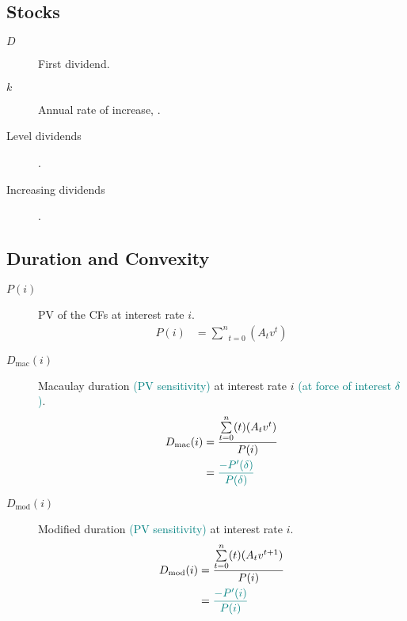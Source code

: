 \documentclass[10pt, french]{article}
\begin{document}
\begin{multicols*}{2}
\subsection{Stocks}
\begin{definitionNOHFILLprop}
\begin{distributions}[Notation]
\begin{description}
	\item[$D$]	First dividend.
	\item[$k$]	Annual rate of increase, .
\end{description}
\end{distributions}
\begin{description}
	\item[Level dividends]	.
	\item[Increasing dividends]	.
\end{description}
\end{definitionNOHFILLprop}


\subsection{Duration and Convexity}
\begin{description}
	\item[$P(i)$]	PV of the CFs at interest rate $i$.
		\begin{align*}
		P(i)	
		&=	\underset{t = 0}{\overset{n}{\sum}} (A_{t}v^{t})
		\end{align*}
\end{description}

\begin{definitionNOHFILLsub}[Duration]
\begin{description}
	\item[$D_{\text{mac}}(i)$]	Macaulay duration \textcolor{teal}{(PV sensitivity)} at interest rate $i$ \textcolor{teal}{(at force of interest $\delta$)}.
		\begin{align*}
		D_{\text{mac}}(i)
		&=	\frac{\underset{t = 0}{\overset{n}{\sum}} (t) (A_{t}v^{t})}{P(i)}	\\
		&=	\textcolor{teal}{\frac{-P'(\delta)}{P(\delta)}}
		\end{align*}
	\item[$D_{\text{mod}}(i)$]	Modified duration \textcolor{teal}{(PV sensitivity)} at interest rate $i$.
		\begin{align*}
		D_{\text{mod}}(i)
		&=	\frac{\underset{t = 0}{\overset{n}{\sum}} (t) (A_{t}v^{t + 1})}{P(i)}	\\
		&=	\textcolor{teal}{\frac{-P'(i)}{P(i)}}
		\end{align*}
\end{description}


\end{definitionNOHFILLsub}
\end{multicols*}
\end{document}
